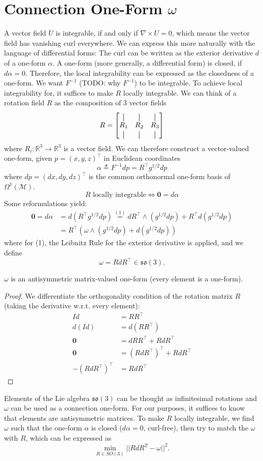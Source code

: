 \documentclass[../thesis.tex]{subfiles}
\begin{document}
\chapter{Connection One-Form $\omega$}
A vector field $U$ is integrable, if and only if $\nabla \times U = 0$,
which means the vector field has vanishing curl everywhere.
We can express this more naturally with the language of differential forms:
The curl can be written as the exterior derivative $d$ of a one-form $\alpha$.
A one-form (more generally, a differential form) is closed, if $d\alpha = 0$.
Therefore, the local integrability can be expressed as the closedness of a one-form.
We want $F^{-1}$ (TODO: why $F^{-1}$) to be integrable.
To achieve local integrability for, it suffices to make $R$ locally integrable.
We can think of a rotation field $R$ as the composition of 3 vector fields
$$R = \begin{bmatrix}
  \vertbar & \vertbar & \vertbar \\
  R_1 & R_2 & R_3 \\
  \vertbar & \vertbar & \vertbar
\end{bmatrix}$$
where $R_i : \mathbb{R}^3 \to \mathbb{R}^3$ is a vector field.
We can therefore construct a vector-valued one-form, given $p=(x,y,z)^{\top}$ in Euclidean coordinates
$$\alpha \triangleq F^{-1}dp = R^{\top}g^{1/2}dp$$
where $dp = (dx,dy,dz)^{\top}$ is the common orthonormal one-form basis of $\Omega^1(\mathcal{M})$.
$$R \text{ locally integrable} \iff \bm{0} = d\alpha$$
Some reformulations yield:
\begin{align*}
  \bm{0} = d\alpha &= d(R^{\top}g^{1/2}dp)\overset{(1)}{=} dR^{\top} \wedge  (g^{1/2}dp) + R^{\top}d(g^{1/2}dp) \\
  &= R^{\top}(\omega \wedge (g^{1/2}dp)+ d(g^{1/2}dp))
\end{align*} where for (1), the Leibnitz Rule for the exterior derivative is applied,
and we define
$$\omega = RdR^{\top} \in \mathfrak{so}(3).$$
\begin{remark}
  $\omega$ is an antisymmetric matrix-valued one-form (every element is a one-form).
\end{remark}
\begin{proof}
  We differentiate the orthogonality condition of the rotation matrix $R$ (taking the derivative w.r.t. every element):
  \begin{align*}
    Id &= RR^{\top} \\
    d(Id) &= d(RR^{\top}) \\
    \bm{0} &= dRR^{\top} + RdR^{\top} \\
    \bm{0} &= (RdR^{\top})^{\top} + RdR^{\top} \\
    -(RdR^{\top})^{\top} &= RdR^{\top}
  \end{align*}
\end{proof}
Elements of the Lie algebra $\mathfrak{so}(3)$ can be thought as infinitesimal rotations and $\omega$ can be used
as a connection one-form. For our purposes, it suffices to know that elements are antisymmetric matrices.
To make $R$ locally integrable, we find $\omega$ such that the one-form $\alpha$ is closed ($d\alpha = 0$, curl-free),
then try to match the $\omega$ with $R$, which can be expressed as
$$\min_{R\in SO(3)} ||RdR^T - \omega ||^2.$$
\end{document}
